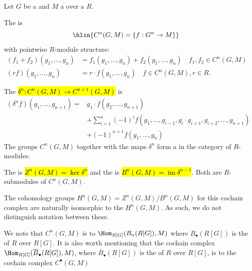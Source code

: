 \begin{definition} \label{definition:group_cochain_complex_with_coefficients_in_a_group_module_over_a_ring}
Let $G$ be a  and $M$ a  over a  $R$. 

The  is
$$\hlin{ C^n(G,M) = \{ f: G^n \to M\} }$$
with pointwise $R$-module structure: 
\begin{align*}
(f_1 + f_2)(g_1,\dots,g_n) &= f_1(g_1,\dots,g_n) + f_2(g_1,\dots,g_n) \quad f_1,f_2 \in C^n(G,M) \\
(rf)(g_1,\dots,g_n) &= r \cdot f(g_1,\dots,g_n) \quad f \in C^n(G,M), r \in R.
\end{align*}

The  \hl{$\delta^n: C^n(G,M) \to C^{n+1}(G,M)$} is
\begin{align*}
(\delta^n f)(g_1,\dots,g_{n+1}) =& g_1 \cdot f(g_2,\ldots,g_{n+1}) \\
&+ \sum_{i=1}^n (-1)^i f(g_1,\ldots,g_{i-1}, g_i \cdot g_{i+1}, g_{i+2}, \ldots, g_{n+1})  \\
&+ (-1)^{n+1} f(g_1,\ldots,g_n)
\end{align*}
The groups $C^n(G,M)$ together with the maps $\delta^n$ form a  in the category of $R$-modules.

The  is \hl{$Z^n(G,M) = \ker \delta^n$} and the  is \hl{$B^n(G,M) = \operatorname{im} \delta^{n-1}$}. Both are $R$-submodules of $C^n(G,M)$.

The cohomology groups $H^n(G,M) = Z^n(G,M) / B^n(G,M)$ for this cochain complex are naturally isomorphic to the  $H^n(G,M)$. As such, we do not distinguish notation between these.

We note that $C^n(G,M)$ is  to $\Hom_{R[G]}(B_n(R[G]), M)$ where $B_\bullet(R[G])$ is the  of $R$ over $R[G]$. It is also worth mentioning that the cochain complex $\Hom_{R[G]}(\overline{B}_\bullet(R[G]), M)$, where $\overline{B}_\bullet(R[G])$ is the  of $R$ over $R[G]$, is  to the cochain complex $C^\bullet(G,M)$
\end{definition}